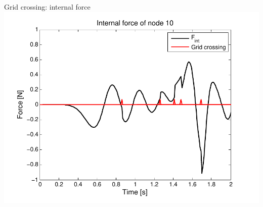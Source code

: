 \documentclass[mathserif,professionalfont,hyperref={pdfpagelabels=false}]{beamer}
\begin{document}
\begin{frame}{Grid crossing: internal force}
\centering
\includegraphics[width=0.7\paperwidth,height=0.7\paperheight]{images/Grid_crossing}
\end{frame}
\end{document}
